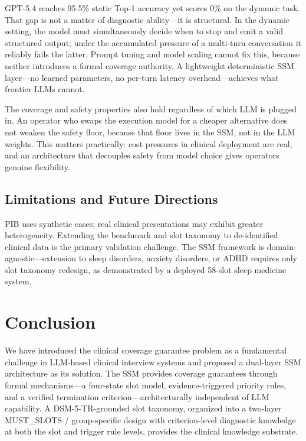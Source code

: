 \documentclass[conference]{IEEEtran}
\begin{document}
GPT-5.4 reaches 95.5\% static Top-1 accuracy yet scores 0\% on the dynamic task. That gap is not a matter of diagnostic ability---it is structural. In the dynamic setting, the model must simultaneously decide when to stop and emit a valid structured output; under the accumulated pressure of a multi-turn conversation it reliably fails the latter. Prompt tuning and model scaling cannot fix this, because neither introduces a formal coverage authority. A lightweight deterministic SSM layer---no learned parameters, no per-turn latency overhead---achieves what frontier LLMs cannot.

The coverage and safety properties also hold regardless of which LLM is plugged in. An operator who swaps the execution model for a cheaper alternative does not weaken the safety floor, because that floor lives in the SSM, not in the LLM weights. This matters practically: cost pressures in clinical deployment are real, and an architecture that decouples safety from model choice gives operators genuine flexibility.

\subsection{Limitations and Future Directions}

PIB uses synthetic cases; real clinical presentations may exhibit greater heterogeneity. Extending the benchmark and slot taxonomy to de-identified clinical data is the primary validation challenge. The SSM framework is domain-agnostic---extension to sleep disorders, anxiety disorders, or ADHD requires only slot taxonomy redesign, as demonstrated by a deployed 58-slot sleep medicine system.


\section{Conclusion}

We have introduced the clinical coverage guarantee problem as a fundamental challenge in LLM-based clinical interview systems and proposed a dual-layer SSM architecture as its solution. The SSM provides coverage guarantees through formal mechanisms---a four-state slot model, evidence-triggered priority rules, and a verified termination criterion---architecturally independent of LLM capability. A DSM-5-TR-grounded slot taxonomy, organized into a two-layer MUST\_SLOTS / group-specific design with criterion-level diagnostic knowledge at both the slot and trigger rule levels, provides the clinical knowledge substrate.
\end{document}
